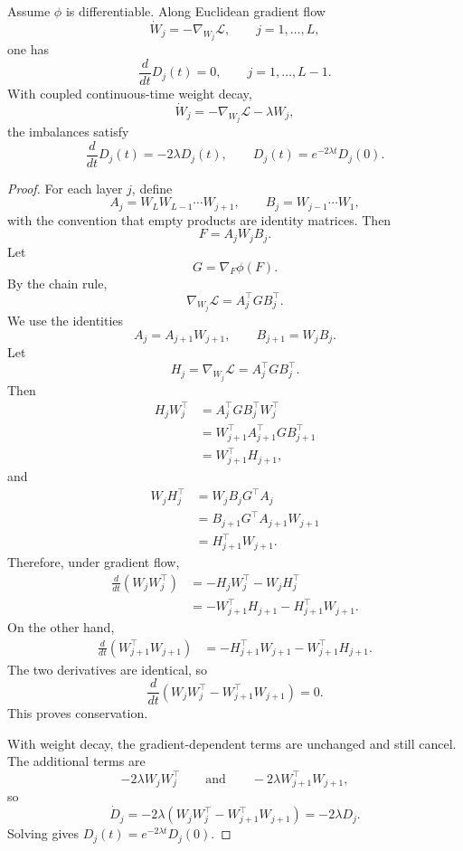 \documentclass[10pt,a4paper]{amsart}
\newcommand{\Loss}{\mathcal{L}}
\begin{document}
\begin{proposition}
Assume \(\phi\) is differentiable.  Along Euclidean gradient flow
\[
    \dot W_j=-\nabla_{W_j}\Loss,
    \qquad
    j=1,\ldots,L,
\]
one has
\[
    \frac{d}{dt}D_j(t)=0,
    \qquad
    j=1,\ldots,L-1.
\]
With coupled continuous-time weight decay,
\[
    \dot W_j=-\nabla_{W_j}\Loss-\lambda W_j,
\]
the imbalances satisfy
\[
    \frac{d}{dt}D_j(t)=-2\lambda D_j(t),
    \qquad
    D_j(t)=e^{-2\lambda t}D_j(0).
\]
\end{proposition}

\begin{proof}
For each layer \(j\), define
\[
    A_j=W_LW_{L-1}\cdots W_{j+1},
    \qquad
    B_j=W_{j-1}\cdots W_1,
\]
with the convention that empty products are identity matrices.  Then
\[
    F=A_jW_jB_j.
\]
Let
\[
    G=\nabla_F\phi(F).
\]
By the chain rule,
\[
    \nabla_{W_j}\Loss
    =
    A_j^\top G B_j^\top.
\]
We use the identities
\[
    A_j=A_{j+1}W_{j+1},
    \qquad
    B_{j+1}=W_jB_j.
\]
Let
\[
    H_j=\nabla_{W_j}\Loss=A_j^\top G B_j^\top.
\]
Then
\[
\begin{aligned}
    H_jW_j^\top
    &=
    A_j^\top G B_j^\top W_j^\top  \\
    &=
    W_{j+1}^\top A_{j+1}^\top G B_{j+1}^\top  \\
    &=
    W_{j+1}^\top H_{j+1},
\end{aligned}
\]
and
\[
\begin{aligned}
    W_jH_j^\top
    &=
    W_jB_jG^\top A_j  \\
    &=
    B_{j+1}G^\top A_{j+1}W_{j+1}  \\
    &=
    H_{j+1}^\top W_{j+1}.
\end{aligned}
\]
Therefore, under gradient flow,
\[
\begin{aligned}
    \frac{d}{dt}(W_jW_j^\top)
    &=
    -H_jW_j^\top-W_jH_j^\top  \\
    &=
    -W_{j+1}^\top H_{j+1}
    -
    H_{j+1}^\top W_{j+1}.
\end{aligned}
\]
On the other hand,
\[
\begin{aligned}
    \frac{d}{dt}(W_{j+1}^\top W_{j+1})
    &=
    -H_{j+1}^\top W_{j+1}
    -
    W_{j+1}^\top H_{j+1}.
\end{aligned}
\]
The two derivatives are identical, so
\[
    \frac{d}{dt}
    \left(
        W_jW_j^\top
        -
        W_{j+1}^\top W_{j+1}
    \right)
    =
    0.
\]
This proves conservation.

With weight decay, the gradient-dependent terms are unchanged and still
cancel.  The additional terms are
\[
    -2\lambda W_jW_j^\top
    \qquad\text{and}\qquad
    -2\lambda W_{j+1}^\top W_{j+1},
\]
so
\[
    \dot D_j
    =
    -2\lambda
    \left(
        W_jW_j^\top
        -
        W_{j+1}^\top W_{j+1}
    \right)
    =
    -2\lambda D_j.
\]
Solving gives \(D_j(t)=e^{-2\lambda t}D_j(0)\).
\end{proof}
\end{document}
